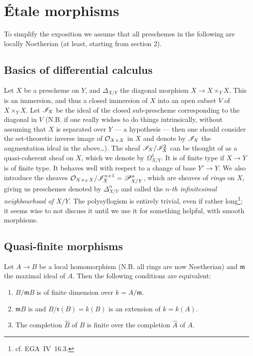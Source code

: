 \documentclass[../main.tex]{subfiles}
\begin{document}
\setcounter{chapter}{0}
\chapter{Étale morphisms}

To simplify the exposition we assume that all preschemes in the following are locally Noetherian (at least, starting from section 2).


\section{Basics of differential calculus}

Let $X$ be a prescheme on $Y$, and $\Delta_{X/Y}$ the diagonal morphism $X\to X\times_Y X$.
This is an immersion, and thus a closed immersion of $X$ into an open subset $V$ of $X\times_Y X$.
Let $\mathscr{I}_X$ be the ideal of the closed sub-prescheme corresponding to the diagonal in $V$ (N.B. if one really wishes to do things intrinsically, without assuming that $X$ is separated over $Y$ — a  hypothesis — then one should consider the set-theoretic inverse image of $\mathcal{O}_{X\times X}$ in $X$ and denote by $\mathscr{I}_X$ the augmentation ideal in the above\ldots).
The sheaf $\mathscr{I}_X/\mathscr{I}_X^2$ can be thought of as a quasi-coherent sheaf on $X$, which we denote by $\Omega_{X/Y}^1$.
It is of finite type if $X\to Y$ is of finite type.
It behaves well with respect to a change of base $Y'\to Y$.
We also introduce the sheaves $\mathcal{O}_{X\times_Y X}/\mathscr{I}_X^{n+1}=\mathscr{P}^n_{X/Y}$, which are sheaves of \emph{rings} on $X$, giving us preschemes denoted by $\Delta_{X/Y}^n$ and called the \emph{$n$-th infinitesimal neighbourhood of $X/Y$}.
The polysyllogism is entirely trivial, even if rather long\footnote{cf. EGA~IV~16.3.}; it seems wise to not discuss it until we use it for something helpful, with smooth morphisms.


\section{Quasi-finite morphisms}

\begin{prop}
    Let $A\to B$ be a local homomorphism (N.B. all rings are now Noetherian) and $\mathfrak{m}$ the maximal ideal of $A$.
    Then the following conditions are equivalent:
    \begin{enumerate}[\normalfont(i)]
        \item $B/\mathfrak{m}B$ is of finite dimension over $k=A/\mathfrak{m}$.
        \item $\mathfrak{m}B$ is \unsure{[\ldots]} and $B/\mathfrak{r}(B)=k(B)$ is an extension of $k=k(A)$.
        \item The completion $\hat{B}$ of $B$ is finite over the completion $\hat{A}$ of $A$.
    \end{enumerate}
\end{prop}
\end{document}
